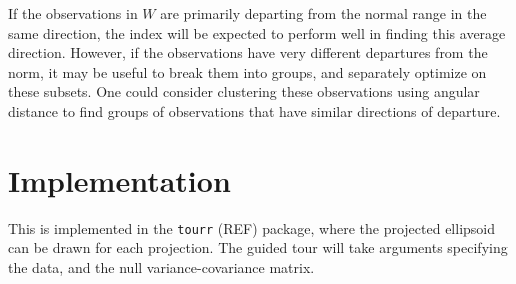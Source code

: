 \documentclass[
  12pt]{article}
\begin{document}
If the observations in \(W\) are primarily departing from the normal
range in the same direction, the index will be expected to perform well
in finding this average direction. However, if the observations have
very different departures from the norm, it may be useful to break them
into groups, and separately optimize on these subsets. One could
consider clustering these observations using angular distance to find
groups of observations that have similar directions of departure.

\section{Implementation}\label{implementation}

This is implemented in the \texttt{tourr} (REF) package, where the
projected ellipsoid can be drawn for each projection. The guided tour
will take arguments specifying the data, and the null
variance-covariance matrix.
\end{document}
